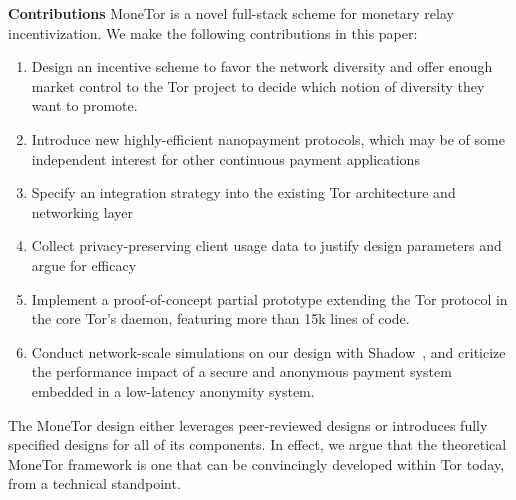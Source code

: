\textbf{Contributions} MoneTor is a novel full-stack scheme for monetary relay
incentivization. We make the following contributions in this paper:

\begin{enumerate}
\item Design an incentive scheme to favor the network diversity and offer enough market control to the Tor project to decide which notion of diversity they want to promote.
\item Introduce new highly-efficient nanopayment protocols, which may be of some
  independent interest for other continuous payment applications
\item Specify an integration strategy into the existing Tor architecture and networking layer
\item Collect privacy-preserving client usage data to justify design parameters
  and argue for efficacy
\item Implement a proof-of-concept partial prototype extending the Tor protocol in the core Tor's daemon, featuring more than 15k lines of code.
\item Conduct network-scale simulations on our design with Shadow~\cite{jansen2011shadow}, and criticize the performance impact of a secure and anonymous payment system embedded in a low-latency anonymity system.
\end{enumerate}

The MoneTor design either leverages peer-reviewed designs or introduces fully
specified designs for all of its components. In effect, we argue that the
theoretical MoneTor framework is one that can be convincingly developed within
Tor today, from a technical standpoint.